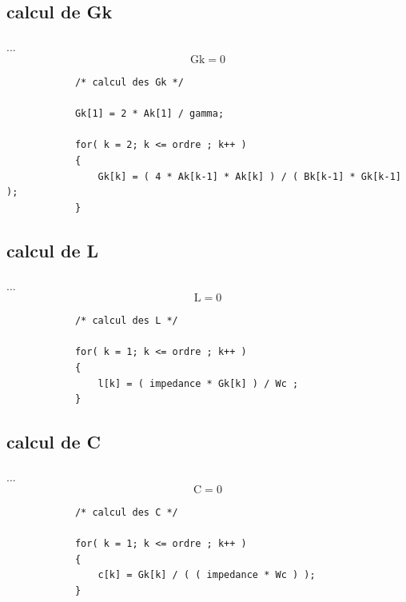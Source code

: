 \documentclass[a4paper,11pt]{article}
\begin{document}
    \subsection{calcul de Gk }
        \paragraph{}
        ... \[ \mbox{Gk} = 0 \]
        \begin{lstlisting}
            /* calcul des Gk */

            Gk[1] = 2 * Ak[1] / gamma;

            for( k = 2; k <= ordre ; k++ )
            {
                Gk[k] = ( 4 * Ak[k-1] * Ak[k] ) / ( Bk[k-1] * Gk[k-1] );
            }

        \end{lstlisting}

    \clearpage

    \subsection{calcul de L }
        \paragraph{}
        ... \[ \mbox{L} = 0 \]
        \begin{lstlisting}
            /* calcul des L */

            for( k = 1; k <= ordre ; k++ )
            {
                l[k] = ( impedance * Gk[k] ) / Wc ;
            }

        \end{lstlisting}

    \subsection{calcul de C }
        \paragraph{}
        ... \[ \mbox{C} = 0 \]
        \begin{lstlisting}
            /* calcul des C */

            for( k = 1; k <= ordre ; k++ )
            {
                c[k] = Gk[k] / ( ( impedance * Wc ) );
            }

        \end{lstlisting}


    \clearpage
\end{document}
